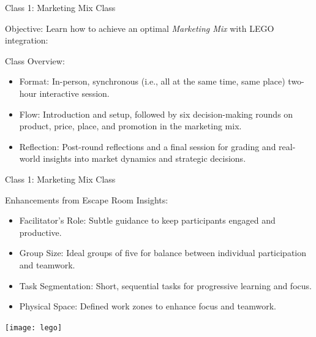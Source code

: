 \documentclass[
  ignorenonframetext,
]{beamer}
\providecommand{\tightlist}{%
  \setlength{\itemsep}{0pt}\setlength{\parskip}{0pt}}
\begin{document}
\begin{frame}{Class 1: Marketing Mix Class}
\label{class-1-marketing-mix-class}
\small

Objective: Learn how to achieve an optimal \emph{Marketing Mix} with
LEGO integration:

Class Overview:

\begin{itemize}
\tightlist
\item
  Format: In-person, synchronous (i.e., all at the same time, same
  place) two-hour interactive session.
\item
  Flow: Introduction and setup, followed by six decision-making rounds
  on product, price, place, and promotion in the marketing mix.
\item
  Reflection: Post-round reflections and a final session for grading and
  real-world insights into market dynamics and strategic decisions.
\end{itemize}
\end{frame}

\begin{frame}{Class 1: Marketing Mix Class}
\label{class-1-marketing-mix-class-1}
\small

Enhancements from Escape Room Insights:

\begin{itemize}
\tightlist
\item
  Facilitator's Role: Subtle guidance to keep participants engaged and
  productive.
\item
  Group Size: Ideal groups of five for balance between individual
  participation and teamwork.
\item
  Task Segmentation: Short, sequential tasks for progressive learning
  and focus.
\item
  Physical Space: Defined work zones to enhance focus and teamwork.
\end{itemize}

\begin{flushleft}\texttt{[image: lego]} \end{flushleft}
\end{frame}
\end{document}
